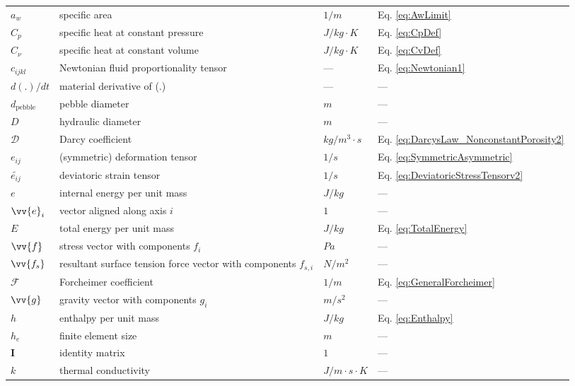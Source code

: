 \documentclass[10pt]{article}
\numberwithin{equation}{section} %
\begin{document}
\begin{tabular}{l l l l}
\(a_w\)				& specific area								& \(1/m\)				& Eq. \eqref{eq:AwLimit}\\
\(C_p\)				& specific heat at constant pressure				& \(J/kg\cdot K\)		& Eq. \eqref{eq:CpDef}\\
\(C_\nu\)				& specific heat at constant volume				& \(J/kg\cdot K\)		& Eq. \eqref{eq:CvDef}\\
\(c_{ijkl}\)				& Newtonian fluid proportionality tensor			& ---					& Eq. \eqref{eq:Newtonian1}\\
\(d(.)/dt\)				& material derivative	of (.)						& --- 					& ---\\
\(d_{\textrm{pebble}}\)	& pebble diameter							& \(m\)				& ---\\
\(D\)					& hydraulic diameter							& \(m\)				& ---\\
\(\mathscr{D}\)			& Darcy coefficient							& \(kg/m^3\cdot s\)		& Eq. \eqref{eq:DarcysLaw_NonconstantPorosity2}\\
\(e_{ij}\)				& (symmetric) deformation tensor				& \(1/s\)				& Eq. \eqref{eq:SymmetricAsymmetric}\\
\(\tilde{e_{ij}}\)			& deviatoric strain tensor						& \(1/s\)				& Eq. \eqref{eq:DeviatoricStressTensorv2}\\
\(e\)					& internal energy per unit mass					& \(J/kg\)				& ---\\
\(\vv{e}_i\)				& vector aligned along axis \(i\)					& \(1\)				& ---\\
\(E\)					& total energy per unit mass					& \(J/kg\)				& Eq. \eqref{eq:TotalEnergy}\\
\(\vv{f}\)				& stress vector with components \(f_i\)			& \(Pa\)				& ---\\
\(\vv{f_s}\)				& resultant surface tension force vector with components \(f_{s,i}\) & \(N/m^2\)	& ---\\
\(\mathscr{F}\)			& Forcheimer coefficient						& \(1/m\)				& Eq. \eqref{eq:GeneralForcheimer}\\
\(\vv{g}\)				& gravity vector with components \(g_i\)			& \(m/s^2\)			& ---\\
\(h\)					& enthalpy per unit mass						& \(J/kg\)				& Eq. \eqref{eq:Enthalpy}\\
\(h_e\)				& finite element size							& \(m\)				& ---\\
\(\textbf{I}\)			& identity matrix							& \(1\)				& ---\\
\(k\)					& thermal conductivity						& \(J/m\cdot s\cdot K\)	& ---\\

\end{tabular}
\end{document}
